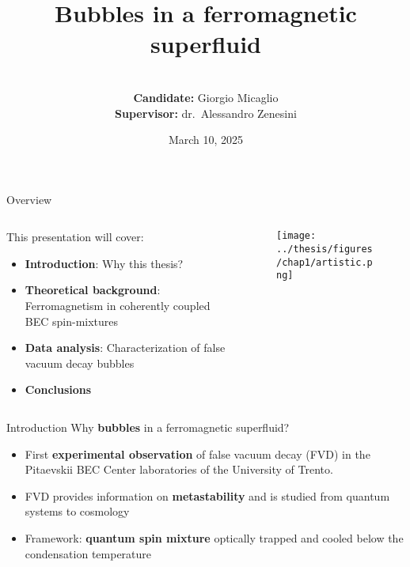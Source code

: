 \documentclass[handout]{beamer}
\title{Bubbles in a ferromagnetic superfluid}
\author{\\\textbf{Candidate:} Giorgio Micaglio\\ \textbf{Supervisor:} dr.\ Alessandro Zenesini }
\date{March 10, 2025}
\institute{\\~\\Bachelor's Degree in Physics}
\begin{document}
\begin{frame}[plain]
    \maketitle
\end{frame}

\begin{frame}{Overview}
    \begin{columns}
        \begin{column}{0.6\textwidth}
            This presentation will cover:
            \begin{itemize}
                \item \textbf{Introduction}: Why this thesis?
                \item \textbf{Theoretical background}: Ferromagnetism in coherently coupled BEC spin-mixtures
                \item \textbf{Data analysis}: Characterization of false vacuum decay bubbles
                \item \textbf{Conclusions}
            \end{itemize}
        \end{column}
        \begin{column}{0.4\textwidth}
            \begin{figure}
                \centering
                \texttt{[image: ../thesis/figures/chap1/artistic.png]}
            \end{figure}
        \end{column}
    \end{columns}
\end{frame}

\begin{frame}{Introduction}
    Why \textbf{bubbles} in a ferromagnetic superfluid?

    \begin{itemize}
        \item First \textbf{experimental observation} of false vacuum decay (FVD) in the Pitaevskii BEC Center laboratories of the University of Trento.
        \item FVD provides information on \textbf{metastability} and is studied from quantum systems to cosmology
        \item Framework: \textbf{quantum spin mixture} optically trapped and cooled below the condensation temperature
    \end{itemize}
    
\end{frame}
\end{document}
